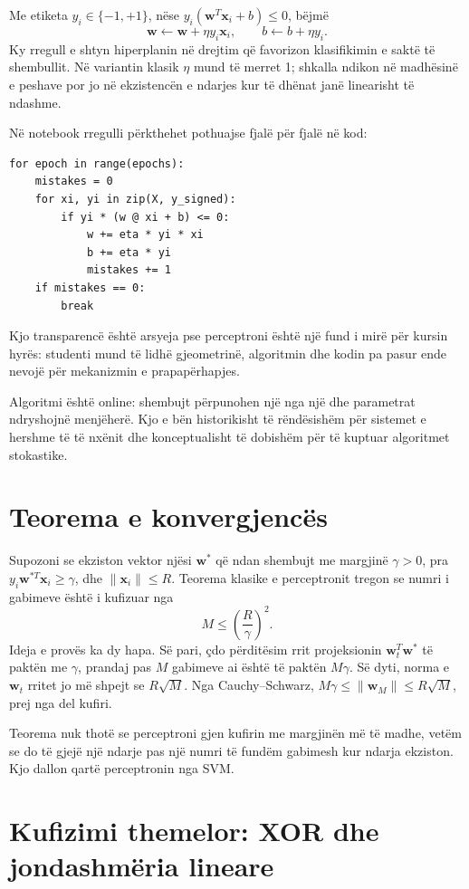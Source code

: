 \documentclass[12pt,a4paper,oneside]{book}
\begin{document}
Me etiketa $y_i\in\{-1,+1\}$, nëse $y_i(\mathbf w^T\mathbf x_i+b)\le0$, bëjmë
\[
\mathbf w\leftarrow\mathbf w+\eta y_i\mathbf x_i,
\qquad b\leftarrow b+\eta y_i.
\]
Ky rregull e shtyn hiperplanin në drejtim që favorizon klasifikimin e saktë të shembullit. Në variantin klasik $\eta$ mund të merret 1; shkalla ndikon në madhësinë e peshave por jo në ekzistencën e ndarjes kur të dhënat janë linearisht të ndashme.

Në notebook rregulli përkthehet pothuajse fjalë për fjalë në kod:
\begin{lstlisting}[caption={Përditësimi i perceptronit nga parimet e para.}]
for epoch in range(epochs):
    mistakes = 0
    for xi, yi in zip(X, y_signed):
        if yi * (w @ xi + b) <= 0:
            w += eta * yi * xi
            b += eta * yi
            mistakes += 1
    if mistakes == 0:
        break
\end{lstlisting}
Kjo transparencë është arsyeja pse perceptroni është një fund i mirë për kursin hyrës: studenti mund të lidhë gjeometrinë, algoritmin dhe kodin pa pasur ende nevojë për mekanizmin e prapapërhapjes.

Algoritmi është online: shembujt përpunohen një nga një dhe parametrat ndryshojnë menjëherë. Kjo e bën historikisht të rëndësishëm për sistemet e hershme të të nxënit dhe konceptualisht të dobishëm për të kuptuar algoritmet stokastike.

\section{Teorema e konvergjencës}

Supozoni se ekziston vektor njësi $\mathbf w^*$ që ndan shembujt me margjinë $\gamma>0$, pra $y_i\mathbf w^{*T}\mathbf x_i\ge\gamma$, dhe $\|\mathbf x_i\|\le R$. Teorema klasike e perceptronit tregon se numri i gabimeve është i kufizuar nga
\[
M\le\left(\frac{R}{\gamma}\right)^2.
\]
Ideja e provës ka dy hapa. Së pari, çdo përditësim rrit projeksionin $\mathbf w_t^T\mathbf w^*$ të paktën me $\gamma$, prandaj pas $M$ gabimeve ai është të paktën $M\gamma$. Së dyti, norma e $\mathbf w_t$ rritet jo më shpejt se $R\sqrt{M}$. Nga Cauchy--Schwarz, $M\gamma\le\|\mathbf w_M\|\le R\sqrt M$, prej nga del kufiri.

Teorema nuk thotë se perceptroni gjen kufirin me margjinën më të madhe, vetëm se do të gjejë një ndarje pas një numri të fundëm gabimesh kur ndarja ekziston. Kjo dallon qartë perceptronin nga SVM.

\section{Kufizimi themelor: XOR dhe jondashmëria lineare}
\end{document}

